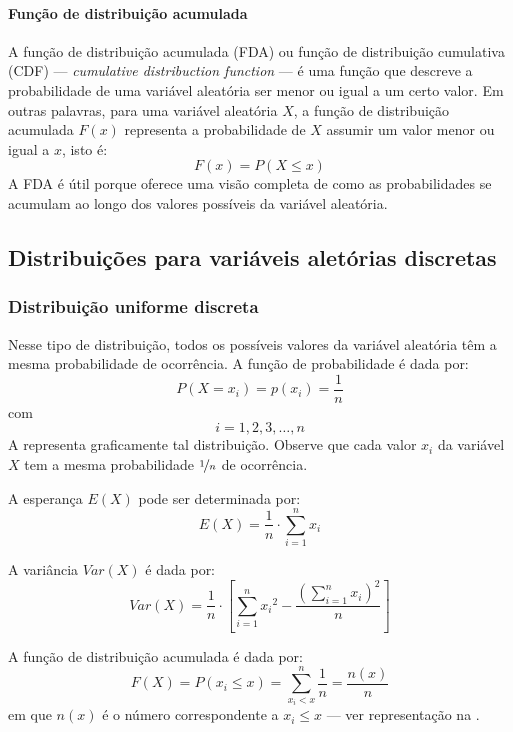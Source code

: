 \paragraph{Função de distribuição acumulada}
A função de distribuição acumulada (FDA) ou função de distribuição cumulativa
(CDF) --- \emph{cumulative distribuction function} --- é uma função que
descreve a probabilidade de uma variável aleatória ser menor ou igual a um
certo valor. Em outras palavras, para uma variável aleatória $X$, a função de
distribuição acumulada $F(x)$ representa a probabilidade de $X$ assumir um
valor menor ou igual a $x$, isto é:
\[
F(x)=P(X \leq x)
\]
A FDA é útil porque oferece uma visão completa de como as probabilidades se
acumulam ao longo dos valores possíveis da variável aleatória.

\subsection{Distribuições para variáveis aletórias discretas}%

\subsubsection{Distribuição uniforme discreta}
Nesse tipo de distribuição, todos os possíveis valores da variável aleatória
têm a mesma probabilidade de ocorrência. A função de probabilidade é dada por:
\begin{equation}
    P(X=x_i) = p(x_i) = \frac{1}{n}
\end{equation}
com
\[
i = 1, 2, 3, \ldots, n
\]
A  representa graficamente tal distribuição.
Observe que cada valor $x_i$ da variável $X$ tem a mesma probabilidade
$\nicefrac{1}{n}$ de ocorrência.

A esperança $E(X)$ pode ser determinada por:
 \begin{equation}
    E(X) = \frac{1}{n} \cdot \sum_{i=1}^{n} x_i
    \label{eq:esperanca-dist-var-alea-discreta}
\end{equation}

A variância $Var(X)$ é dada por:
\begin{equation}
    Var(X) = \frac{1}{n} \cdot \left[
        \sum_{i=1}^{n} {x_i}^2 - \frac{\left(\sum_{i=1}^{n} x_i\right)^2}{n}
    \right]
    \label{eq:variancia-dist-var-alea-discreta}
\end{equation}

A função de distribuição acumulada é dada por:
\begin{equation}
    F(X) = P(x_i \leq x) = \sum_{x_i<x}^{n} \frac{1}{n} = \frac{n(x)}{n}
\end{equation}
em que $n(x)$ é o número correspondente a $x_i \leq x$ --- ver representação na
.

